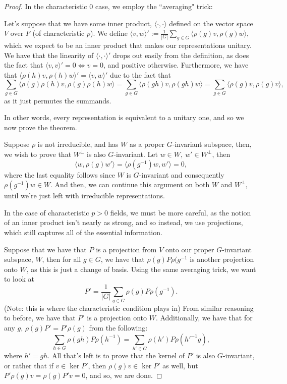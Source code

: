\documentclass{article}
\begin{document}
\begin{proof}

In the characteristic $0$ case, we employ the ``averaging" trick:

Let's suppose that we have some inner product, $\langle \cdot , \cdot \rangle$ defined on the vector space $V$ over $F$ (of characteristic $p$). We define $\langle v, w \rangle' := \frac{1}{|G|} \sum_{g \in G} \langle \rho(g)v , \rho(g)w \rangle,$ which we expect to be an inner product that makes our representations unitary. We have that the linearity of $\langle \cdot, \cdot \rangle '$ drops out easily from the definition, as does the fact that $\langle v,v \rangle' = 0 \iff v = 0$, and positive otherwise. Furthermore, we have that $\langle \rho(h)v, \rho(h)w \rangle' = \langle v, w \rangle'$ due to the fact that $$\sum_{g \in G} \langle \rho(g)\rho(h)v, \rho(g)\rho(h)w \rangle = \sum_{g \in G} \langle \rho(gh)v, \rho(gh)w \rangle = \sum_{g \in G} \langle \rho(g)v, \rho(g)v\rangle,$$ as it just permutes the summands.

In other words, every representation is equivalent to a unitary one, and so we now prove the theorem.

Suppose $\rho$ is not irreducible, and has $W$ as a proper $G$-invariant subspace, then, we wish to prove that $W^\perp$ is also $G$-invariant. Let $w \in W, \ w' \in W^\perp$, then $$\langle w, \rho(g)w' \rangle = \langle \rho(g^{-1})w, w' \rangle  = 0,$$ where the last equality follows since $W$ is $G$-invariant and consequently $\rho(g^{-1})w \in W$. And then, we can continue this argument on both $W$ and $W^\perp,$ until we're just left with irreducible representations.

In the case of characteristic $p>0$ fields, we must be more careful, as the notion of an inner product isn't nearly as strong, and so instead, we use projections, which still captures all of the essential information.

Suppose that we have that $P$ is a projection from $V$ onto our proper $G$-invariant subspace, $W$, then for all $g \in G$, we have that $\rho(g)P\rho(g^{-1}$ is another projection onto $W$, as this is just a change of basis. Using the same averaging trick, we want to look at $$P' = \frac{1}{|G|} \sum_{g \in G} \rho(g)P\rho(g^{-1}).$$ (Note: this is where the characteristic condition plays in) From similar reasoning to before, we have that $P'$ is a projection onto $W$. Additionally, we have that for any $g$, $\rho(g)P'=P'\rho(g)$ from the following:
$$ \sum_{h \in G} \rho(gh)P\rho(h^{-1}) = \sum_{h' \in G} \rho(h')P\rho(h'^{-1}g),$$ where $h' = gh$. All that's left is to prove that the kernel of $P'$ is also $G$-invariant, or rather that if $v \in \ker P'$, then $\rho(g)v \in \ker P'$ as well, but $P'\rho(g)v = \rho(g)P'v=0$, and so, we are done.

\end{proof}
\end{document}
